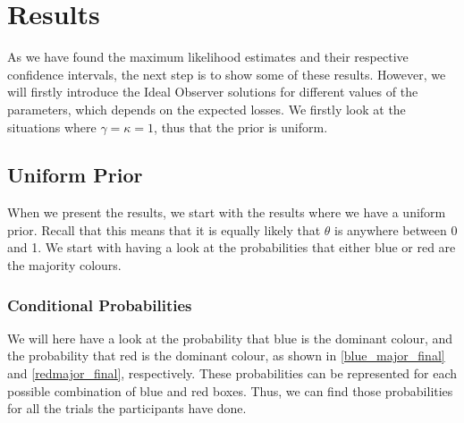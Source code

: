\chapter{Results}

As we have found the maximum likelihood estimates and their respective confidence intervals, the next step is to show some of these results. However, we will firstly introduce the Ideal Observer solutions for different values of the parameters, which depends on the expected losses. We firstly look at the situations where $\gamma=\kappa=1$, thus that the prior is uniform. 

\section{Uniform Prior}
When we present the results, we start with the results where we have a uniform prior. Recall that this means that it is equally likely that $\theta$ is anywhere between 0 and 1. We start with having a look at the probabilities that either blue or red are the majority colours. 

\subsection{Conditional Probabilities}
We will here have a look at the probability that blue is the dominant colour, and the probability that red is the dominant colour, as shown in \eqref{blue_major_final} and \eqref{redmajor_final}, respectively. These probabilities can be represented for each possible combination of blue and red boxes. Thus, we can find those probabilities for all the trials the participants have done. 

